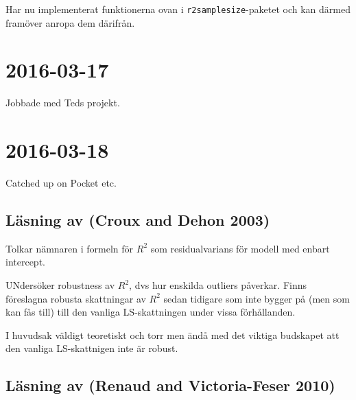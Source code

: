 \documentclass[]{article}
\newenvironment{Shaded}{\begin{snugshade}}{\end{snugshade}}
\newcommand{\KeywordTok}[1]{\textcolor[rgb]{0.13,0.29,0.53}{\textbf{{#1}}}}
\newcommand{\DataTypeTok}[1]{\textcolor[rgb]{0.13,0.29,0.53}{{#1}}}
\newcommand{\DecValTok}[1]{\textcolor[rgb]{0.00,0.00,0.81}{{#1}}}
\newcommand{\StringTok}[1]{\textcolor[rgb]{0.31,0.60,0.02}{{#1}}}
\newcommand{\NormalTok}[1]{{#1}}
\begin{document}
\begin{Shaded}
\end{Shaded}

Har nu implementerat funktionerna ovan i \texttt{r2samplesize}-paketet
och kan därmed framöver anropa dem därifrån.

\section{2016-03-17}\label{section-2}

Jobbade med Teds projekt.

\section{2016-03-18}\label{section-3}

Catched up on Pocket etc.

\subsection{Läsning av (Croux and Dehon
2003)}\label{lasning-av-croux2003}

Tolkar nämnaren i formeln för \(R^2\) som residualvarians för modell med
enbart intercept.

UNdersöker robustness av \(R^2\), dvs hur enskilda outliers påverkar.
Finns föreslagna robusta skattningar av \(R^2\) sedan tidigare som inte
bygger på (men som kan fås till) till den vanliga LS-skattningen under
vissa förhållanden.

I huvudsak väldigt teoretiskt och torr men ändå med det viktiga
budskapet att den vanliga LS-skattnigen inte är robust.

\subsection{Läsning av (Renaud and Victoria-Feser
2010)}\label{lasning-av-renaud2010}
\end{document}

